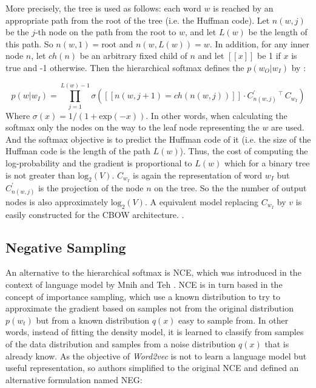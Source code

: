 More precisely, the tree is used as follows: each word $w$ is reached by an
appropriate path from the root of the tree (i.e. the Huffman code). Let
$n(w,j)$ be the $j$-th node on the path from the root to $w$, and let $L(w)$
be the length of this path. So $n(w,1) = \text{root}$ and $n(w,L(w)) = w$. In
addition, for any inner node $n$, let $ch(n)$ be an arbitrary fixed child of
$n$ and let $[\![ x ]\!] $ be 1 if $x$ is true and -1 otherwise. Then the
hierarchical softmax defines the $p(w_O|w_I)$  by \cite{MikolovSCCD13} : 


\begin{equation}
   \label{eq:hierarchical-softmax-prob}
  p(w|w_I)  = \prod^{L(w)-1}_{j=1}\sigma\left( [\![n(w,j + 1) = ch(n(w,j))   ]\!] \cdot C^{'}_{n(w,j)}  \,^\top\, C_{w_I}   \right) 
\end{equation}
Where $\sigma(x) = 1/(1 + \text{exp}(-x)) $. In other words,  when
calculating the softmax only the nodes on the way to the leaf node
representing the $w$ are used. And the softmax objective is to predict the
Huffman code of it (i.e. the size of the Huffman code is the length of the
path $L(w)$).  Thus, the cost of computing the
log-probability and the gradient is proportional to $L(w)$ which for a
binary tree is not greater than $\text{log}_2(V)$.   $C_{w_{I}}$ is again the
representation  of word $w_{I}$  but   $  C^{'}_{n(w,j)}
$ is the projection of the node $n$ on the tree.  So the the number of output
nodes is also  approximately $\text{log}_2(V)$. A equivalent model replacing
$C_{w_I}$ by $v$ is easily constructed for the \ac{CBOW} architecture.  .  

\subsection{Negative Sampling}

An alternative to the hierarchical softmax is \ac{NCE}, which was  introduced in the
context of language model by Mnih and Teh \cite{citeulike:4416856}. \ac{NCE}
is in turn based in the concept of importance sampling, which use a known
distribution to try to approximate the gradient based on samples not from the
original distribution $p(w_t) $ but from a known distribution $q(x)$ easy to
sample from.  In other words, instead of fitting the density model, it is
learned to classify from samples of the data distribution and samples from a
noise distribution $q(x)$ that is already know. 
As the objective of \textit{Word2vec} is not to learn a language model but
useful representation, so authors simplified  to the original \ac{NCE} and
defined an  alternative formulation named \ac{NEG}: 

